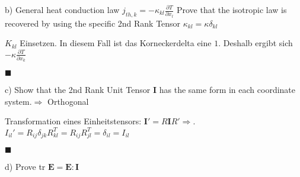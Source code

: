\documentclass[a4paper]{scrartcl}
\begin{document}
b) General heat conduction law $j_{th,k}=-\kappa_{kl}\frac{\partial
T}{\partial x_l}$ Prove that the isotropic law is recovered by using the
specific 2nd Rank Tensor $\kappa_{kl}=\kappa \delta_{kl}$

$K_{kl}$ Einsetzen. In diesem Fall ist das Korneckerdelta eine $1$. Deshalb
ergibt sich $-\kappa \frac{\partial T}{\partial x_k}$ \begin{flushright}
$\blacksquare$ \end{flushright}

c) Show that the 2nd Rank Unit Tensor $\mathbf{I}$ has the same form in each
coordinate system.$\Rightarrow$ Orthogonal

Transformation eines Einheitstensors: $\mathbf{I}'=R\mathbf{I}R'\Rightarrow$.
$I_{il}'=R_{ij}\delta_{jk}R_{kl}^T = R_{ij}R_{jl}^T=\delta_{il}=I_{il}$ \begin{flushright}
$\blacksquare$ \end{flushright}

d) Prove tr $\mathbf{E}=\mathbf{E : I}$
\end{document}
